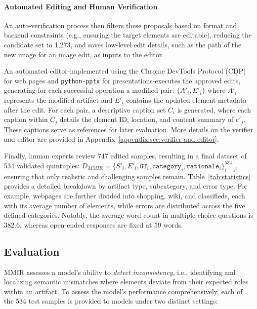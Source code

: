 \paragraph{Automated Editing and Human Verification}
An auto-verification process then filters these proposals based on format and backend constraints (e.g., ensuring the target elements are editable), reducing the candidate set to 1,273, and saves low-level edit details, such as the path of the new image for an image edit, as inputs to the editor. 

An automated editor-implemented using the Chrome DevTools Protocol (CDP) for web pages and \texttt{python-pptx} for presentations-executes the approved edits, generating for each successful operation a modified pair: $\{A'_i, E'_i\}$ where $A'_i$ represents the modified artifact and $E'_i$ contains the updated element metadata after the edit.
For each pair, a descriptive caption set $C_i$ is generated, where each caption within $C_j$ details the element ID, location, and content summary of $e'_j$. These captions serve as references for later evaluation.
More details on the verifier and editor are provided in Appendix~\ref{appendix:sec:verifier and editor}.



Finally, human experts review 747 edited samples, resulting in a final dataset of 534 validated quintuples: 
$D_{MMIR} = \{S'_i, E'_i, \mathtt{GT}_i, \mathtt{category}_i, \mathtt{rationale}_i\}_{i=1}^{534}$, ensuring that only realistic and challenging samples remain. Table~\ref{tab:statistics} provides a detailed breakdown by artifact type, subcategory, and error type. For example, webpages are further divided into shopping, wiki, and classifieds, each with its average number of elements, while errors are distributed across the five defined categories. Notably, the average word count in multiple-choice questions is 382.6, whereas open-ended responses are fixed at 59 words.

\subsection{Evaluation}

MMIR assesses a model's ability to \emph{detect inconsistency}, i.e., identifying and localizing semantic mismatches where elements deviate from their expected roles within an artifact. To assess the model's performance comprehensively, each of the 534 test samples is provided to models under two distinct settings:

